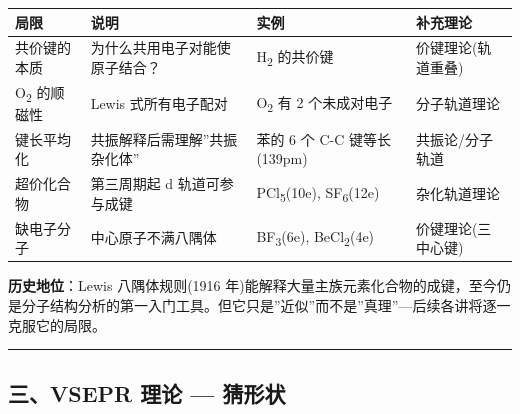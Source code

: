 {\def\LTcaptype{none} %
\begin{longtable}[]{@{}
  >{\raggedright\arraybackslash}p{}
  >{\raggedright\arraybackslash}p{}
  >{\raggedright\arraybackslash}p{}
  >{\centering\arraybackslash}p{}@{}}
\toprule\noalign{}
\begin{minipage}[b]{\linewidth}\raggedright
局限
\end{minipage} & \begin{minipage}[b]{\linewidth}\raggedright
说明
\end{minipage} & \begin{minipage}[b]{\linewidth}\raggedright
实例
\end{minipage} & \begin{minipage}[b]{\linewidth}\centering
补充理论
\end{minipage} \\
\midrule\noalign{}
\endhead
\bottomrule\noalign{}
\endlastfoot
共价键的本质 & 为什么共用电子对能使原子结合？ & H\textsubscript{2} 的共价键 & 价键理论(轨道重叠) \\
O\textsubscript{2} 的顺磁性 & Lewis 式所有电子配对 & O\textsubscript{2} 有 2 个未成对电子 & 分子轨道理论 \\
键长平均化 & 共振解释后需理解''共振杂化体'' & 苯的 6 个 C-C 键等长(139pm) & 共振论/分子轨道 \\
超价化合物 & 第三周期起 d 轨道可参与成键 & PCl\textsubscript{5}(10e), SF\textsubscript{6}(12e) & 杂化轨道理论 \\
缺电子分子 & 中心原子不满八隅体 & BF\textsubscript{3}(6e), BeCl\textsubscript{2}(4e) & 价键理论(三中心键) \\
\end{longtable}
}

\textbf{历史地位}：Lewis 八隅体规则(1916 年)能解释大量主族元素化合物的成键，至今仍是分子结构分析的第一入门工具。但它只是''近似''而不是''真理''---后续各讲将逐一克服它的局限。

\begin{center}\rule{0.5\linewidth}{0.5pt}\end{center}

\subsection{三、VSEPR 理论 --- 猜形状}\label{ux4e09vsepr-ux7406ux8bba-ux731cux5f62ux72b6}

